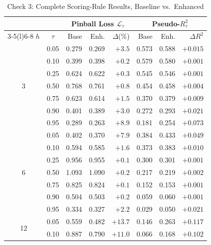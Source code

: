 \documentclass[12pt]{article}
\begin{document}
\begin{table}[htbp]\begin{center}
\caption{Check 3: Complete Scoring-Rule Results, Baseline vs.\ Enhanced}
\label{tab:pinball}
\begin{threeparttable}\small\setlength{\tabcolsep}{5.5pt}
\begin{tabular}{@{}cc *{3}{r} @{\hspace{8pt}} *{3}{r}@{}}
\toprule
 &  & \multicolumn{3}{c}{Pinball Loss $\mathcal{L}_\tau$}
    & \multicolumn{3}{c}{Pseudo-$R^2_\tau$}\\
\cmidrule(lr){3-5}\cmidrule(l){6-8}
$h$ & $\tau$ & Base & Enh. & $\Delta$(\%) & Base & Enh. & $\Delta R^2$\\
\midrule
\multirow{7}{*}{3}
 & 0.05 & 0.279 & 0.269 & $+3.5$ & 0.573 & 0.588 & $+0.015$\\
 & 0.10 & 0.399 & 0.398 & $+0.2$ & 0.579 & 0.580 & $+0.001$\\
 & 0.25 & 0.624 & 0.622 & $+0.3$ & 0.545 & 0.546 & $+0.001$\\
 & 0.50 & 0.768 & 0.761 & $+0.8$ & 0.454 & 0.458 & $+0.004$\\
 & 0.75 & 0.623 & 0.614 & $+1.5$ & 0.370 & 0.379 & $+0.009$\\
 & 0.90 & 0.401 & 0.389 & $+3.0$ & 0.272 & 0.293 & $+0.021$\\
 & 0.95 & 0.289 & 0.263 & $+8.9$ & 0.181 & 0.254 & $+0.073$\\
\midrule
\multirow{7}{*}{6}
 & 0.05 & 0.402 & 0.370 & $+7.9$ & 0.384 & 0.433 & $+0.049$\\
 & 0.10 & 0.594 & 0.585 & $+1.6$ & 0.373 & 0.383 & $+0.010$\\
 & 0.25 & 0.956 & 0.955 & $+0.1$ & 0.300 & 0.301 & $+0.001$\\
 & 0.50 & 1.093 & 1.090 & $+0.2$ & 0.217 & 0.219 & $+0.002$\\
 & 0.75 & 0.825 & 0.824 & $+0.1$ & 0.152 & 0.153 & $+0.001$\\
 & 0.90 & 0.504 & 0.503 & $+0.2$ & 0.059 & 0.060 & $+0.001$\\
 & 0.95 & 0.334 & 0.327 & $+2.2$ & 0.029 & 0.050 & $+0.021$\\
\midrule
\multirow{7}{*}{12}
 & \cellcolor{yellow!25}0.05 & \cellcolor{yellow!25}0.559 & \cellcolor{yellow!25}0.482 & \cellcolor{yellow!25}$\mathbf{+13.7}$ & \cellcolor{yellow!25}0.146 & \cellcolor{yellow!25}0.263 & \cellcolor{yellow!25}$\mathbf{+0.117}$\\
 & \cellcolor{yellow!25}0.10 & \cellcolor{yellow!25}0.887 & \cellcolor{yellow!25}0.790 & \cellcolor{yellow!25}$\mathbf{+11.0}$ & \cellcolor{yellow!25}0.066 & \cellcolor{yellow!25}0.168 & \cellcolor{yellow!25}$\mathbf{+0.102}$\\

\end{tabular}
\end{threeparttable}
\end{center}
\end{table}
\end{document}
